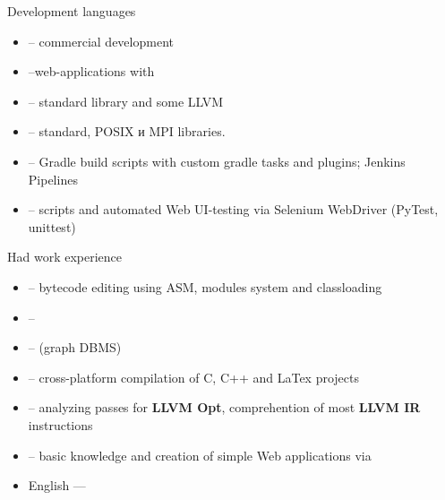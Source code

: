 \documentclass[10pt,a4paper,ragged2e,withhyper]{custom-altacv}
\begin{document}
\begin{paracol}{2}

\textcolor{emphasis}{Development languages}
\vspace{2ex}

\begin{itemize}
	\item {} -- commercial development
	\item {} --web-applications with 
	\item {} -- standard library and some LLVM
	\item {} -- standard, POSIX и MPI libraries.
	\item {} -- Gradle build scripts with custom gradle tasks and plugins; Jenkins Pipelines
	\vspace{1ex}
	\item {} -- scripts and automated Web UI-testing via Selenium WebDriver (PyTest, unittest)
\end{itemize}

\divider

\textcolor{emphasis}{Had work experience}
\vspace{2ex}

\begin{itemize}
	\item {} -- bytecode editing using ASM, modules system and classloading
	\item {} -- 
	\item {} --  (graph DBMS)
	\item {} -- cross-platform compilation of C, C++ and LaTex projects
	\item {} -- analyzing passes for \textbf{LLVM Opt}, comprehention of most \textbf{LLVM IR} instructions
	\item {} -- basic knowledge and creation of simple Web applications via 
\end{itemize}




\begin{itemize}
	\item English --- 
\end{itemize}

\end{paracol}
\end{document}
